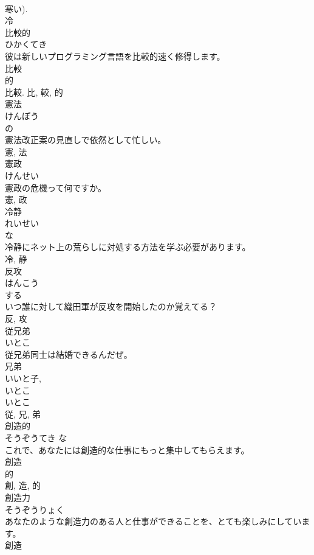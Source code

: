 \documentclass[8pt]{extreport}
\begin{document}
\begin{CJK}{UTF8}{min}
\\	寒い).	
\\	冷	
\\	比較的	
\\	ひかくてき	
\\	彼は新しいプログラミング言語を比較的速く修得します。	
\\	比較 
\\	的 
\\	比較.	比, 較, 的	
\\	憲法	
\\	けんぽう	
\\	の 
\\	憲法改正案の見直しで依然として忙しい。	
\\	憲, 法	
\\	憲政	
\\	けんせい	
\\	憲政の危機って何ですか。	
\\	憲, 政	
\\	冷静	
\\	れいせい	
\\	な 
\\	冷静にネット上の荒らしに対処する方法を学ぶ必要があります。	
\\	冷, 静	
\\	反攻	
\\	はんこう	
\\	する 
\\	いつ誰に対して織田軍が反攻を開始したのか覚えてる？	
\\	反, 攻	
\\	従兄弟	
\\	いとこ	
\\	従兄弟同士は結婚できるんだぜ。	
\\	兄弟 
\\	いいと子, 
\\	いとこ 
\\	いとこ 
\\	従, 兄, 弟	
\\	創造的	
\\	そうぞうてき	な 
\\	これで、あなたには創造的な仕事にもっと集中してもらえます。	
\\	創造 
\\	的 
\\	創, 造, 的	
\\	創造力	
\\	そうぞうりょく	
\\	あなたのような創造力のある人と仕事ができることを、とても楽しみにしています。	
\\	創造 

\end{CJK}
\end{document}
